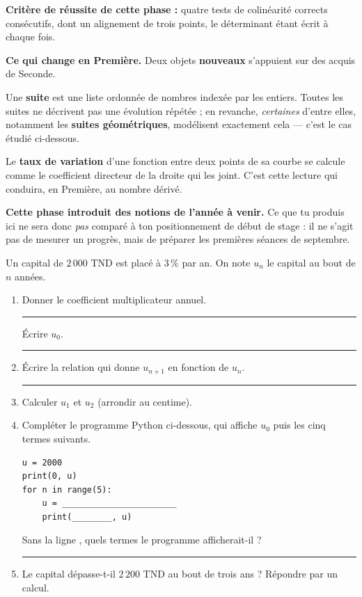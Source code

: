 \documentclass[10pt,a4paper]{article}
\begin{document}
\begin{successbox}\textbf{Critère de réussite de cette phase :} quatre tests de colinéarité corrects consécutifs, dont un alignement de trois points, le déterminant étant écrit à chaque fois.\end{successbox}
\certline
\needspace{62mm}\par\vspace{3mm}

\begin{methodbox}
\textbf{Ce qui change en Première.} Deux objets \textbf{nouveaux} s'appuient sur des acquis de Seconde.
\par\smallskip
Une \textbf{suite} est une liste ordonnée de nombres indexée par les entiers. Toutes les suites ne décrivent
pas une évolution répétée ; en revanche, \emph{certaines} d'entre elles, notamment les \textbf{suites
géométriques}, modélisent exactement cela — c'est le cas étudié ci-dessous.
\par\smallskip
Le \textbf{taux de variation} d'une fonction entre deux points de sa courbe se calcule comme le coefficient
directeur de la droite qui les joint. C'est cette lecture qui conduira, en Première, au nombre dérivé.
\end{methodbox}
\begin{warningbox}\small
\textbf{Cette phase introduit des notions de l'année à venir.} Ce que tu produis ici ne sera donc
\emph{pas} comparé à ton positionnement de début de stage : il ne s'agit pas de mesurer un progrès,
mais de préparer les premières séances de septembre.
\end{warningbox}


Un capital de $2\,000$ TND est placé à $3\,\%$ par an. On note $u_n$ le capital au bout de $n$ années.
\begin{enumerate}
\item Donner le coefficient multiplicateur annuel. \rule{35mm}{0.32pt} \quad Écrire $u_0$. \rule{28mm}{0.32pt}
\item Écrire la relation qui donne $u_{n+1}$ en fonction de $u_n$. \rule{55mm}{0.32pt}
\item Calculer $u_1$ et $u_2$ (arrondir au centime).
\item Compléter le programme Python ci-dessous, qui affiche $u_0$ puis les cinq termes suivants.
\begin{lstlisting}
u = 2000
print(0, u)
for n in range(5):
    u = _______________________
    print(________, u)
\end{lstlisting}
\par\vspace{0.5mm}
Sans la ligne , quels termes le programme afficherait-il ? \rule{45mm}{0.32pt}
\item Le capital dépasse-t-il $2\,200$ TND au bout de trois ans ? Répondre par un calcul.
\end{enumerate}
\end{document}
